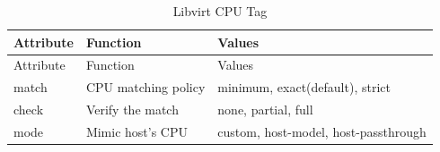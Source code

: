 \documentclass[
  14pt,
  english,
  a4paper,
]{scrreprt}
\begin{document}
\hypertarget{tbl:lvirt_cpu_tag}{}
\begin{longtable}[]{@{}lll@{}}
\caption{\label{tbl:lvirt_cpu_tag}Libvirt CPU Tag}\tabularnewline
\toprule
\begin{minipage}[b]{0.15\columnwidth}\raggedright
Attribute\strut
\end{minipage} & \begin{minipage}[b]{0.28\columnwidth}\raggedright
Function\strut
\end{minipage} & \begin{minipage}[b]{0.49\columnwidth}\raggedright
Values\strut
\end{minipage}\tabularnewline
\midrule
\endfirsthead
\toprule
\begin{minipage}[b]{0.15\columnwidth}\raggedright
Attribute\strut
\end{minipage} & \begin{minipage}[b]{0.28\columnwidth}\raggedright
Function\strut
\end{minipage} & \begin{minipage}[b]{0.49\columnwidth}\raggedright
Values\strut
\end{minipage}\tabularnewline
\midrule
\endhead
\begin{minipage}[t]{0.15\columnwidth}\raggedright
match\strut
\end{minipage} & \begin{minipage}[t]{0.28\columnwidth}\raggedright
CPU matching policy\strut
\end{minipage} & \begin{minipage}[t]{0.49\columnwidth}\raggedright
minimum, exact(default), strict\strut
\end{minipage}\tabularnewline
\begin{minipage}[t]{0.15\columnwidth}\raggedright
check\strut
\end{minipage} & \begin{minipage}[t]{0.28\columnwidth}\raggedright
Verify the match\strut
\end{minipage} & \begin{minipage}[t]{0.49\columnwidth}\raggedright
none, partial, full\strut
\end{minipage}\tabularnewline
\begin{minipage}[t]{0.15\columnwidth}\raggedright
mode\strut
\end{minipage} & \begin{minipage}[t]{0.28\columnwidth}\raggedright
Mimic host's CPU\strut
\end{minipage} & \begin{minipage}[t]{0.49\columnwidth}\raggedright
custom, host-model, host-passthrough\strut
\end{minipage}\tabularnewline
\bottomrule
\end{longtable}
\end{document}

